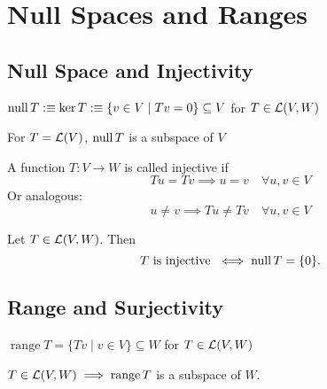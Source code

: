 \section{Null Spaces and Ranges}

\subsection{Null Space and Injectivity}

\begin{mydef}
  $\operatorname{null} T :\equiv \ker T :\equiv \{ v \in V \mid Tv=0\} \subseteq V$ for $T \in {\mathcal{L}(V,W)}$
\end{mydef}

\setcounter{thm}{12}
\begin{thm}
  For $T=\mathcal{L}(V)$, $\operatorname{null} T$ is a subspace of $V$ 
\end{thm}

\setcounter{thm}{13}
\begin{mydef}
  A function $T: V \to W$ is called injective if
  \begin{equation}
    Tu = Tv \implies u = v \quad \forall u,v \in V
  \end{equation}
  Or analogous:
  \begin{equation}
    u \neq v \implies Tu \neq Tv \quad \forall u,v \in V
  \end{equation}
\end{mydef}

\setcounter{thm}{14}
\begin{mydef}
  Let $T \in {\mathcal{L}(V,W)}$. Then
  \begin{equation}
    T \text{ is injective } \iff \operatorname{null} T = \{0 \}.
  \end{equation}
\end{mydef}

\subsection{Range and Surjectivity}
\setcounter{thm}{15}
\begin{mydef}
  $\operatorname{range}T= \{Tv \mid v \in V\} \subseteq W$ for $T \in {\mathcal{L}(V,W)}$
\end{mydef}

\setcounter{thm}{17}
\begin{thm}
  $T\in {\mathcal{L}(V,W)} \implies \operatorname{range} T$ is a subspace of $W$.
\end{thm}

